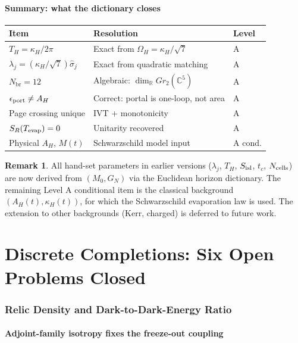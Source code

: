 \documentclass[12pt]{article}
\theoremstyle{plain}
\theoremstyle{definition}
\newtheorem{remark}[theorem]{Remark}
\numberwithin{equation}{section}
\newcommand{\R}{\mathbb{R}}
\newcommand{\C}{\mathbb{C}}
\newcommand{\br}{\mathrm{br}}
\begin{document}
\subsection{Summary: what the dictionary closes}

\begin{center}
\begin{tabular}{p{4.5cm}p{5cm}p{2cm}}
\toprule
Item & Resolution & Level\\
\midrule
$T_H = \kappa_H/2\pi$ & Exact from $\Omega_H = \kappa_H/\sqrt{7}$ & A\\
$\lambda_j = (\kappa_H/\sqrt{7})\hat{\sigma}_j$ & Exact from quadratic matching & A\\
$N_\br = 12$ & Algebraic: $\dim_\R Gr_2(\C^5)$ & A\\
$\epsilon_{\rm port} \neq A_H$ & Correct: portal is one-loop, not area & A\\
Page crossing unique & IVT + monotonicity & A\\
$S_R(T_{\rm evap}) = 0$ & Unitarity recovered & A\\
Physical $A_H$, $M(t)$ & Schwarzschild model input & A cond.\\
\bottomrule
\end{tabular}
\end{center}

\begin{remark}
All hand-set parameters in earlier versions ($\lambda_j$, $T_H$, $S_{\rm isl}$, $t_c$, $N_{\rm cells}$) are now derived from $(M_0, G_N)$ via the Euclidean horizon dictionary.  The remaining Level A conditional item is the classical background $(A_H(t), \kappa_H(t))$, for which the Schwarzschild evaporation law is used.  The extension to other backgrounds (Kerr, charged) is deferred to future work.
\end{remark}


\part{Discrete Completions: Six Open Problems Closed}

\section{Relic Density and Dark-to-Dark-Energy Ratio}\label{sec:omegaclose}

\subsection{Adjoint-family isotropy fixes the freeze-out coupling}
\end{document}
